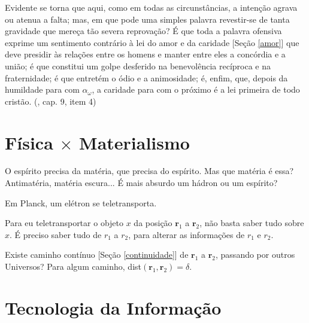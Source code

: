 \documentclass[12pt,a4paper]{article}
\begin{document}
			Evidente se torna que aqui, como em todas as circunst\^ancias, a inten\c{c}\~ao agrava ou atenua a falta; mas, em que pode uma simples palavra revestir-se de tanta gravidade que mere\c{c}a t\~ao severa reprova\c{c}\~ao? \'E que toda a palavra ofensiva\cite{palavrasAtiradas} exprime um sentimento contr\'ario \`a lei do amor e da caridade [Se\c{c}\~ao \ref{amor}] que deve presidir \`as rela\c{c}\~oes entre os homens e manter entre eles a conc\'ordia e a uni\~ao\cite{unidade}; \'e que constitui um golpe desferido na benevol\^encia rec\'iproca e na fraternidade; \'e que entret\'em o \'odio e a animosidade; \'e, enfim, que, depois da humildade para com $ \alpha_\omega $, a caridade para com o pr\'oximo \'e a lei primeira de todo crist\~ao. (\cite{ese}, cap. 9, item 4)

	\section{F\'isica $ \times $ Materialismo}\label{fisica}
		\begin{flushright}
		\end{flushright}

		O esp\'irito precisa da mat\'eria, que precisa do esp\'irito. Mas que mat\'eria \'e essa? Antimat\'eria, mat\'eria escura... \'E mais absurdo um h\'adron ou um esp\'irito?

		\begin{center}




		\end{center}

		Em Planck\cite{planck}, um el\'etron se teletransporta.

		Para eu teletransportar o objeto $x$ da posi\c{c}\~ao $\mathbf{r}_1$ a $\mathbf{r}_2$, n\~ao basta saber tudo sobre $x$. \'E preciso saber tudo de $r_1$ a $r_2$, para alterar as informa\c{c}\~oes de $r_1$ e $r_2$.

		Existe caminho cont\'inuo [Se\c{c}\~ao \ref{continuidade}] de $\mathbf{r}_1$ a $\mathbf{r}_2$, passando por outros Universos? Para algum caminho, dist$(\mathbf{r}_1, \mathbf{r}_2) = \delta $.

	\section{Tecnologia da Informa\c{c}\~ao}
			\begin{flushright}
			\end{flushright}
\end{document}
